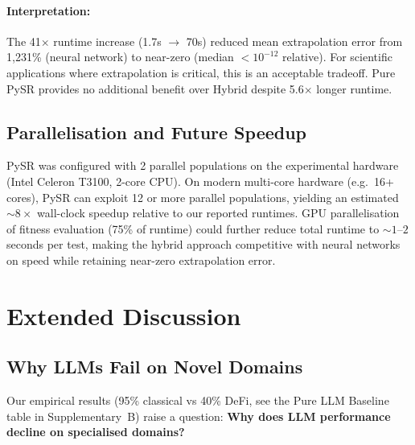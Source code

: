 \documentclass[twoside,11pt]{article}
\begin{document}
\paragraph{Interpretation:} The 41$\times$ runtime increase (1.7s $\to$ 70s) reduced mean extrapolation error from 1,231\% (neural network) to near-zero (median $< 10^{-12}$ relative). For scientific applications where extrapolation is critical, this is an acceptable tradeoff. Pure PySR provides no additional benefit over Hybrid despite 5.6$\times$ longer runtime.

\subsection{Parallelisation and Future Speedup}

PySR was configured with 2 parallel populations on the experimental hardware (Intel Celeron T3100, 2-core CPU). On modern multi-core hardware (e.g.\ 16+ cores), PySR can exploit 12 or more parallel populations, yielding an estimated ${\sim}8\times$ wall-clock speedup relative to our reported runtimes. GPU parallelisation of fitness evaluation (75\% of runtime) could further reduce total runtime to ${\sim}1$--$2$ seconds per test, making the hybrid approach competitive with neural networks on speed while retaining near-zero extrapolation error.




\section{Extended Discussion}
\label{app:extended_discussion}

\subsection{Why LLMs Fail on Novel Domains}

Our empirical results (95\% classical vs 40\% DeFi, see the Pure LLM Baseline table in Supplementary~B) raise a question: \textbf{Why does LLM performance decline on specialised domains?}\citep{kambhampati2024llms}
\end{document}
